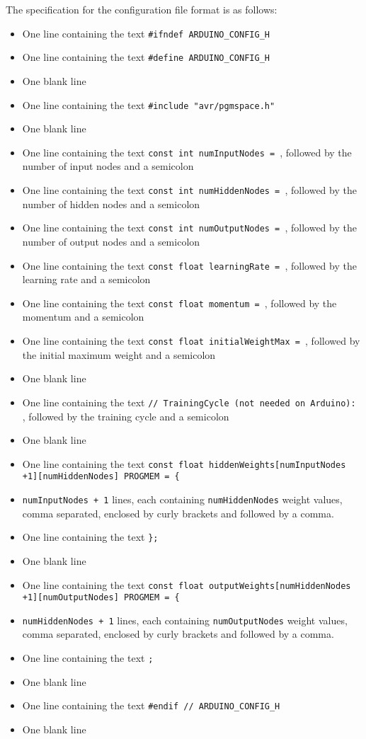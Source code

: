 \documentclass[a4paper]{article}
\begin{document}
The specification for the configuration file format is as follows:

\begin{itemize}
\item One line containing the text \lstinline{#ifndef ARDUINO_CONFIG_H}
\item One line containing the text \lstinline{#define ARDUINO_CONFIG_H}
\item One blank line
\item One line containing the text \lstinline{#include "avr/pgmspace.h"}
\item One blank line
\item One line containing the text \lstinline{const int numInputNodes = }, followed by the number of input nodes and a semicolon
\item One line containing the text \lstinline{const int numHiddenNodes = }, followed by the number of hidden nodes and a semicolon
\item One line containing the text \lstinline{const int numOutputNodes = }, followed by the number of output nodes and a semicolon
\item One line containing the text \lstinline{const float learningRate = }, followed by the learning rate and a semicolon
\item One line containing the text \lstinline{const float momentum = }, followed by the momentum and a semicolon
\item One line containing the text \lstinline{const float initialWeightMax = }, followed by the initial maximum weight and a semicolon
\item One blank line
\item One line containing the text \lstinline{// TrainingCycle (not needed on Arduino): }, followed by the training cycle and a semicolon
\item One blank line
\item One line containing the text \lstinline|const float hiddenWeights[numInputNodes +1][numHiddenNodes] PROGMEM = {|
\item \lstinline{numInputNodes + 1} lines, each containing \lstinline{numHiddenNodes} weight values, comma separated, enclosed by curly brackets and followed by a comma.
\item One line containing the text \lstinline|};|
\item One blank line
\item One line containing the text \lstinline|const float outputWeights[numHiddenNodes +1][numOutputNodes] PROGMEM = {|
\item \lstinline{numHiddenNodes + 1} lines, each containing \lstinline{numOutputNodes} weight values, comma separated, enclosed by curly brackets and followed by a comma.
\item One line containing the text \lstinline|;|
\item One blank line
\item One line containing the text \lstinline{#endif // ARDUINO_CONFIG_H}
\item One blank line
\end{itemize}
\end{document}
